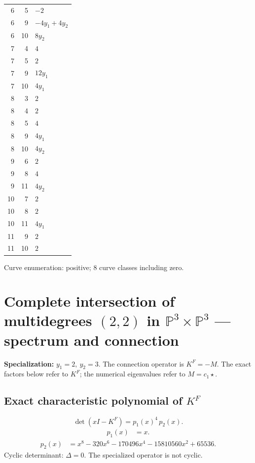 \documentclass[10pt,a4paper]{article}
\begin{document}
{\begin{longtable}{rrp{125mm}}
6 & 5 & $-2$\\
6 & 9 & $- 4 y_{1} + 4 y_{2}$\\
6 & 10 & $8 y_{2}$\\
7 & 4 & $4$\\
7 & 5 & $2$\\
7 & 9 & $12 y_{1}$\\
7 & 10 & $4 y_{1}$\\
8 & 3 & $2$\\
8 & 4 & $2$\\
8 & 5 & $4$\\
8 & 9 & $4 y_{1}$\\
8 & 10 & $4 y_{2}$\\
9 & 6 & $2$\\
9 & 8 & $4$\\
9 & 11 & $4 y_{2}$\\
10 & 7 & $2$\\
10 & 8 & $2$\\
10 & 11 & $4 y_{1}$\\
11 & 9 & $2$\\
11 & 10 & $2$\\
\end{longtable}}
Curve enumeration: positive; 8 curve classes including zero.
\clearpage\section*{Complete intersection of multidegrees $(2,2)$ in $\mathbb P^{3}\times \mathbb P^{3}$ --- spectrum and connection}
\textbf{Specialization:} $y_1=2,\ y_2=3$. The connection operator is $K^F=-M$. The exact factors below refer to $K^F$; the numerical eigenvalues refer to $M=c_1\star$.
\subsection*{Exact characteristic polynomial of $K^F$}
\[\det(xI-K^F)=p_{1}(x)^{4}\,p_{2}(x).\]
\[\begin{aligned}p_{1}(x)&=x.\end{aligned}\]
\[\begin{aligned}p_{2}(x)&=x^{8} - 320 x^{6} - 170496 x^{4} - 15810560 x^{2} + 65536.\end{aligned}\]
Cyclic determinant: $\Delta=0$. The specialized operator is not cyclic.
\end{document}
